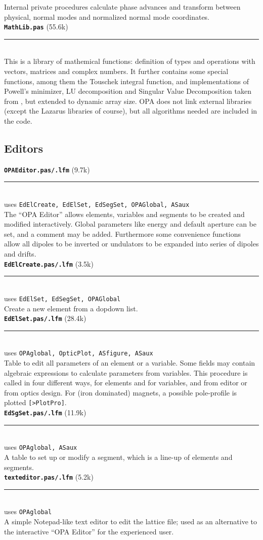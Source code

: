 \documentclass[12pt]{article}
\newcommand\code[1]{{\tt [#1]}}
\newcommand\opamodule[3]{{\bf \tt #1} #2\\  \rule[3pt]{\textwidth}{0.2pt} \\ {\scriptsize uses \tt  #3}\\[1ex]}
\newcommand\opamoduleN[2]{{\bf \tt #1} #2\\  \rule[3pt]{\textwidth}{0.2pt} \\}
\begin{document}
Internal private procedures calculate phase advances and transform between physical, normal modes and normalized normal mode coordinates.\\


\opamoduleN{MathLib.pas}{ (55.6k)}
This is a library of mathemical functions: definition of types and operations with vectors, matrices and complex numbers. It further contains some special functions, among them the Touschek integral function, and implementations of Powell's minimizer, LU decomposition and Singular Value Decomposition taken from \cite{numrec}, but extended to dynamic array size. OPA does not link external libraries (except the Lazarus libraries of course), but all algorithms needed are included in the code.


\subsection{Editors}
\opamodule{OPAEditor.pas/.lfm}{(9.7k)}{EdElCreate, EdElSet, EdSegSet, OPAGlobal, ASaux}
The ``OPA Editor'' allows elements, variables and segments to be created and modified interactively. Global parameters like energy and default aperture can be set, and a comment may be added. Furthermore some convenience functions allow all dipoles to be inverted or undulators to be expanded into series of dipoles and drifts.\\

\opamodule{EdElCreate.pas/.lfm}{(3.5k)}{EdElSet, EdSegSet, OPAGlobal}
Create a new element from a dopdown list.\\

\opamodule{EdElSet.pas/.lfm}{(28.4k)}{OPAglobal, OpticPlot, ASfigure, ASaux}
Table to edit all parameters of an element or a variable. Some fields may contain algebraic expressions to calculate parameters from variables. This procedure is called in four different ways, for elements and for variables, and from editor or from optics design. For (iron dominated) magnets, a possible pole-profile is plotted \code{>PlotPro}.\\

\opamodule{EdSgSet.pas/.lfm}{(11.9k)}{OPAglobal, ASaux}
A table to set up or modify a segment, which is a line-up of elements and segments.\\

\opamodule{texteditor.pas/.lfm}{(5.2k)}{OPAglobal}
A simple Notepad-like text editor to edit the lattice file; used as an alternative to the interactive ``OPA Editor'' for the experienced user.\\
\end{document}
